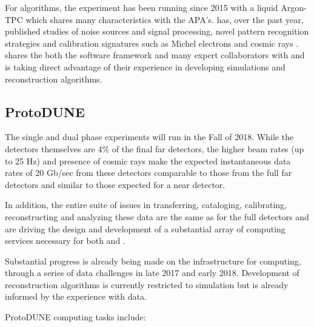 For algorithms, the  \cite{Acciarri:2016smi} experiment has been running since 2015 with a liquid Argon-TPC which shares many characteristics with the   APA's.     has, over the past year, published studies of noise sources and signal processing\cite{Acciarri:2017sde,Adams:2018dra}, novel pattern recognition strategies \cite{Acciarri:2016ryt,Acciarri:2017hat} and calibration signatures such as Michel electrons and cosmic rays \cite{Acciarri:2017sjy,Acciarri:2017sde}.    shares the both the \larsoft software framework and many expert collaborators with   and is taking direct advantage of their experience in developing simulations and reconstruction algorithms.


\subsection{ProtoDUNE}\label{sw:PD-planning}

The  single and dual phase experiments will run in the Fall of 2018.  While the detectors themselves are 4\% of the final far detectors, the higher beam rates (up to 25 Hz) and presence of cosmic rays make the expected instantaneous data rates of 20 Gb/sec from these detectors comparable to those from the full far detectors and similar to those expected for a near detector. 

In addition, the entire suite of issues in transferring, cataloging, calibrating, reconstructing and analyzing these data are the same as for the full detectors and are driving the design and development of a substantial array of computing services necessary for both  and  .

Substantial progress is already being made on the infrastructure for computing, through a series of data challenges in late 2017 and early 2018. Development of reconstruction algorithms is currently restricted to simulation but is already informed by the experience with   data.

ProtoDUNE computing tasks include:

